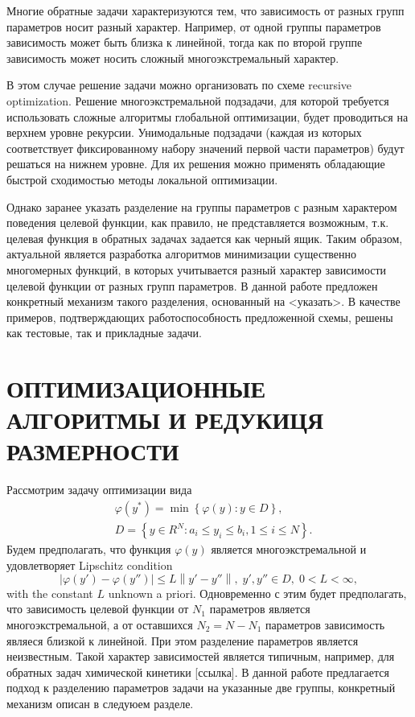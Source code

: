 \documentclass{aip-cp}
\begin{document}
Многие обратные задачи характеризуются тем, что зависимость от разных групп параметров носит разный характер. Например, от одной группы параметров зависимость может быть близка к линейной, тогда как по второй группе зависимость может носить сложный многоэкстремальный характер.

В этом случае решение задачи можно организовать по схеме recursive optimization. Решение  многоэкстремальной подзадачи, для которой требуется использовать сложные алгоритмы глобальной оптимизации, будет проводиться на верхнем уровне рекурсии.
Унимодальные подзадачи (каждая из которых соответствует фиксированному набору значений первой части параметров) будут решаться на нижнем уровне. Для их решения можно применять обладающие быстрой сходимостью методы локальной оптимизации.

Однако заранее указать разделение на группы параметров с разным характером поведения целевой функции, как правило, не представляется возможным, т.к. целевая функция в обратных задачах задается как черный ящик. 
Таким образом, актуальной является разработка алгоритмов минимизации существенно многомерных функций, в которых учитывается разный характер зависимости целевой функции от разных групп параметров. 
В данной работе предложен конкретный механизм такого разделения, основанный на <указать>.
В качестве примеров, подтверждающих работоспособность предложенной схемы, решены как тестовые, так и прикладные задачи.

\section{ОПТИМИЗАЦИОННЫЕ АЛГОРИТМЫ И РЕДУКИЦЯ РАЗМЕРНОСТИ}

Рассмотрим задачу оптимизации вида
\begin{eqnarray}\label{main_problem}
& \varphi(y^\ast)=\min{\left\{\varphi(y): y\in D\right\}}, \nonumber \\
& D=\left\{y\in R^N: a_i\leq y_i \leq b_i, 1\leq i \leq N\right\}. \nonumber
\end{eqnarray}
Будем предполагать, что функция $\varphi(y)$ является многоэкстремальной и удовлетворяет Lipschitz condition
\[
\left|\varphi(y')-\varphi(y'')\right|\leq L\left\|y'-y''\right\|,\; y',y'' \in D,\; 0<L<\infty,
\]
with the constant $L$ unknown a priori.
Одновременно с этим будет предполагать, что зависимость целевой функции от $N_1$ параметров является многоэкстремальной, а от оставшихся $N_2 = N - N_1$ параметров зависимость являеся близкой к линейной. При этом разделение  параметров является неизвестным. Такой характер зависимостей является типичным, например, для обратных задач химической кинетики [ссылка]. В данной работе предлагается подход к разделению параметров задачи на указанные две группы, конкретный механизм описан в следуюем разделе. 
\end{document}
